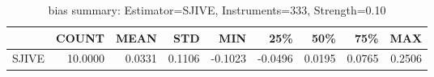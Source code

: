\begin{table}[ht]
\centering
\caption{bias summary: Estimator=SJIVE, Instruments=333, Strength=0.10}
\begin{tabular}{lrrrrrrrr}
\toprule
 & COUNT & MEAN & STD & MIN & 25\% & 50\% & 75\% & MAX \\
\midrule
SJIVE & 10.0000 & 0.0331 & 0.1106 & -0.1023 & -0.0496 & 0.0195 & 0.0765 & 0.2506 \\
\bottomrule
\end{tabular}
\end{table}
